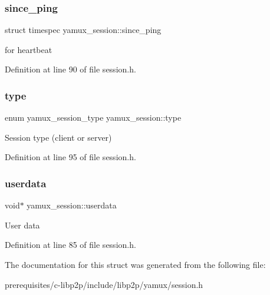 \subsubsection{\texorpdfstring{since\+\_\+ping}{since\_ping}}
{\footnotesize\ttfamily struct timespec yamux\+\_\+session\+::since\+\_\+ping}

for heartbeat 

Definition at line 90 of file session.\+h.

\mbox{\label{structyamux__session_aedf4073b64a4da447135135603cdfeee}} 
\subsubsection{\texorpdfstring{type}{type}}
{\footnotesize\ttfamily enum yamux\+\_\+session\+\_\+type yamux\+\_\+session\+::type}

Session type (client or server) 

Definition at line 95 of file session.\+h.

\mbox{\label{structyamux__session_a64704789056dc91aa5cd19e2924e5b4e}} 
\subsubsection{\texorpdfstring{userdata}{userdata}}
{\footnotesize\ttfamily void$\ast$ yamux\+\_\+session\+::userdata}

User data 

Definition at line 85 of file session.\+h.



The documentation for this struct was generated from the following file\+:\begin{DoxyCompactItemize}
\item 
prerequisites/c-\/libp2p/include/libp2p/yamux/session.\+h\end{DoxyCompactItemize}
